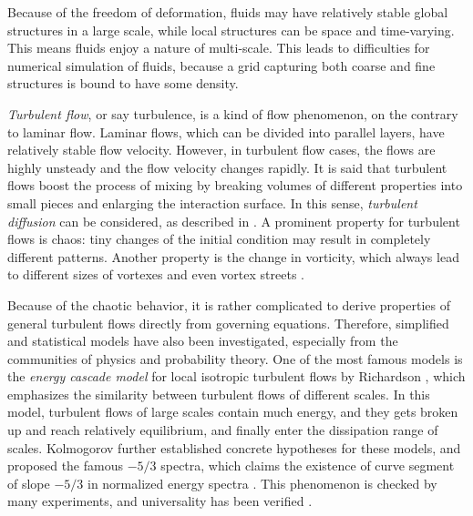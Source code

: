 \documentclass[english, nochinese]{pkupaper}
\begin{document}
Because of the freedom of deformation, fluids may have relatively stable global structures in a large scale, while local structures can be space and time-varying. This means fluids enjoy a nature of multi-scale. This leads to difficulties for numerical simulation of fluids, because a grid capturing both coarse and fine structures is bound to have some density.

\emph{Turbulent flow}, or say turbulence, is a kind of flow phenomenon, on the contrary to laminar flow. Laminar flows, which can be divided into parallel layers, have relatively stable flow velocity. However, in turbulent flow cases, the flows are highly unsteady and the flow velocity changes rapidly. It is said that turbulent flows boost the process of mixing by breaking volumes of different properties into small pieces and enlarging the interaction surface. In this sense, \emph{turbulent diffusion} can be considered, as described in \parencite{ferziger_computational_2002}. A prominent property for turbulent flows is chaos: tiny changes of the initial condition may result in completely different patterns. Another property is the change in vorticity, which always lead to different sizes of vortexes and even vortex streets \parencite{ferziger_computational_2002}.

Because of the chaotic behavior, it is rather complicated to derive properties of general turbulent flows directly from governing equations. Therefore, simplified and statistical models have also been investigated, especially from the communities of physics and probability theory. One of the most famous models is the \emph{energy cascade model} for local isotropic turbulent flows by Richardson \parencite{taylor_diffusion_1922}, which emphasizes the similarity between turbulent flows of different scales. In this model, turbulent flows of large scales contain much energy, and they gets broken up and reach relatively equilibrium, and finally enter the dissipation range of scales. Kolmogorov further established concrete hypotheses for these models, and proposed the famous $ -5 / 3 $ spectra, which claims the existence of curve segment of slope $ -5 / 3 $ in normalized energy spectra \parencite{kolmogorov_equations_1941}. This phenomenon is checked by many experiments, and universality has been verified \parencite{sreenivasan_universality_1995}.
\end{document}
